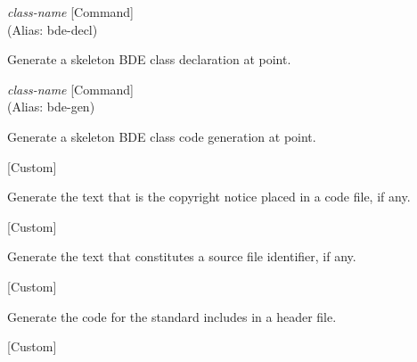 \vspace{1em}
\noindent
{}
\usebox{\funcname}\emph{class-name}
 \hfill [Command]\\%
 (Alias: bde-decl)

\begin{doc-string}
Generate a skeleton BDE class declaration at point.
\end{doc-string}

\vspace{1em}
\noindent
{}
\usebox{\funcname}\emph{class-name}
 \hfill [Command]\\%
 (Alias: bde-gen)

\begin{doc-string}
Generate a skeleton BDE class code generation at point.
\end{doc-string}

\vspace{1em}
\noindent
{}
\usebox{\funcname}
 \hfill [Custom]

\begin{doc-string}
Generate the text that is the copyright notice placed in a code file,
if any.
\end{doc-string}

\vspace{1em}
\noindent
{}
\usebox{\funcname}
 \hfill [Custom]

\begin{doc-string}
Generate the text that constitutes a source file identifier, if any.
\end{doc-string}

\vspace{1em}
\noindent
{}
\usebox{\funcname}
 \hfill [Custom]

\begin{doc-string}
Generate the code for the standard includes in a header file.
\end{doc-string}

\vspace{1em}
\noindent
{}
\usebox{\funcname}
 \hfill [Custom]

